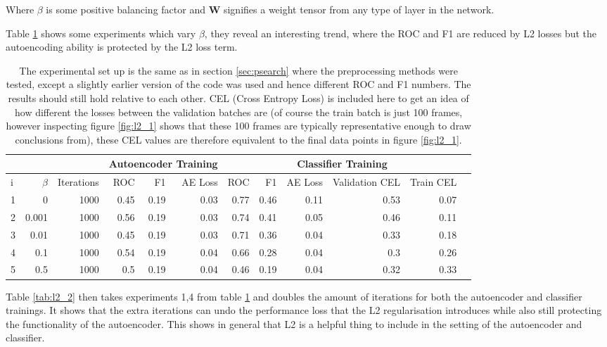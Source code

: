       Where $\beta$ is some positive balancing factor and $\mathbf{W}$ signifies
      a weight tensor from any type of layer in the network.

      Table \ref{tab:l2_1} shows some experiments which vary $\beta$, they reveal an
      interesting trend, where the ROC and F1 are reduced by L2 losses but the autoencoding
      ability is protected by the L2 loss term.

      \begin{table}[!h] {\footnotesize \centering
      \begin{tabular}{lrrrrrrrrrrr}
        &&&   \multicolumn{3}{|c|}{Autoencoder Training} &  \multicolumn{5}{c|}{Classifier Training}  \\
      \hline
       i & $\beta$ &   Iterations &   ROC&F1&AE Loss & ROC & F1 & AE Loss &   Validation CEL &   Train CEL \\
      \hline
       1 &     0     & 1000 &    0.45 &   0.19 &     0.03 &    0.77 &   0.46 &     0.11 &  0.53 &  0.07 \\
       2 &     0.001 & 1000 &    0.56 &   0.19 &     0.03 &    0.74 &   0.41 &     0.05 &  0.46 &  0.11 \\
       3 &     0.01  & 1000 &    0.45 &   0.19 &     0.03 &    0.71 &   0.36 &     0.04 &  0.33 &  0.18 \\
       4 &     0.1   & 1000 &    0.54 &   0.19 &     0.04 &    0.66 &   0.28 &     0.04 &  0.3  &  0.26 \\
       5 &     0.5   & 1000 &    0.5  &   0.19 &     0.04 &    0.46 &   0.19 &     0.04 &  0.32 &  0.33 \\
      \hline
    \end{tabular}
    \caption{The experimental set up is the same as in section \ref{sec:psearch} where the preprocessing methods
    were tested, except a slightly earlier version
    of the code was used and hence different ROC and F1 numbers.
    The results should still hold relative to each other.
    CEL (Cross Entropy Loss) is included here to get an idea of how different
    the losses between the validation batches are (of course the
    train batch is just 100 frames, however inspecting figure \ref{fig:l2_1} shows that
    these 100 frames are typically representative enough to draw conclusions from), these
    CEL values are therefore equivalent to the final data points in figure \ref{fig:l2_1}. } \label{tab:l2_1}
    }
    \end{table}

    Table \ref{tab:l2_2} then takes experiments 1,4 from table \ref{tab:l2_1} and doubles
    the amount of iterations for both the autoencoder and classifier trainings. It shows
    that the extra iterations can undo the performance loss that the L2 regularisation
    introduces while also still protecting the functionality of the autoencoder.
    This shows in general that L2 is a helpful thing to include in the setting of the autoencoder
    and classifier.

